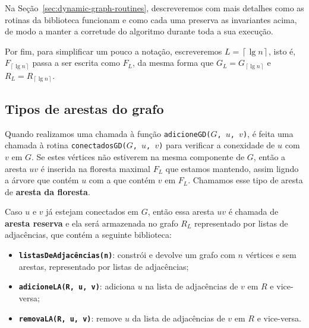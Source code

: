 Na Seção~\ref{sec:dynamic-graph-routines}, descreveremos com mais detalhes como as rotinas da biblioteca funcionam e como cada uma preserva as invariantes acima, de modo a manter a corretude do algoritmo durante toda a sua execução.

Por fim, para simplificar um pouco a notação, escreveremos $L = \left\lceil \lg n \right\rceil$, isto é, $F_{\left\lceil \lg n \right\rceil}$ passa a ser escrita como $F_{L}$, da mesma forma que $G_L = G_{\left\lceil \lg n \right\rceil}$ e $R_L = R_{\left\lceil \lg n \right\rceil}$.

\subsection{Tipos de arestas do grafo}
\label{sec:dynamic-graph-edge-types}


Quando realizamos uma chamada à função \texttt{adicioneGD($G$, $u$, $v$)}, é feita uma chamada à rotina \texttt{conectadosGD($G$, $u$, $v$)} para verificar a conexidade de $u$ com $v$ em $G$. Se estes vértices não estiverem na mesma componente de $G$, então a aresta $uv$ é inserida na floresta maximal $F_L$ que estamos mantendo, assim ligndo a árvore que contém $u$ com a que contém $v$ em $F_L$. Chamamos esse tipo de aresta de \textbf{aresta da floresta}.

Caso $u$ e $v$ já estejam conectados em $G$, então essa aresta $uv$ é chamada de \textbf{aresta reserva} e ela será armazenada no grafo $R_L$ representado por listas de adjacências, que contém a seguinte biblioteca:

\begin{itemize}
    \item \texttt{\textbf{listasDeAdjacências(n)}}: constrói e devolve um grafo com $n$ vértices e sem arestas, representado por listas de adjacências;
    \item \texttt{\textbf{adicioneLA(R, u, v)}}: adiciona $u$ na lista de adjacências de $v$ em $R$ e vice-versa;
    \item \texttt{\textbf{removaLA(R, u, v)}}: remove $u$ da lista de adjacências de $v$ em $R$ e vice-versa.
\end{itemize} 

